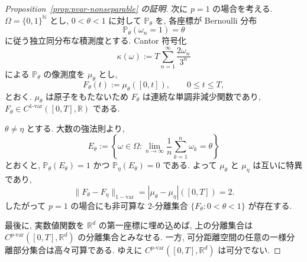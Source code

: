\documentclass[11pt]{article}
\theoremstyle{breakstyle}
\begin{document}
\begin{proof}[Proposition~\ref{prop:pvar-nonseparable} の証明]
    次に $p=1$ の場合を考える. $\Omega=\{0,1\}^{\mathbb{N}}$ とし,
    $0<\theta<1$ に対して $\mathbb{P}_\theta$ を, 各座標が Bernoulli 分布
    \begin{equation*}
        \mathbb{P}_\theta(\omega_n=1)=\theta
    \end{equation*}
    に従う独立同分布な積測度とする. Cantor 符号化
    \begin{equation*}
        \kappa(\omega):=T\sum_{n=1}^\infty\frac{2\omega_n}{3^n}
    \end{equation*}
    による $\mathbb{P}_\theta$ の像測度を $\mu_\theta$ とし,
    \begin{equation*}
        F_\theta(t):=\mu_\theta([0,t]),
        \qquad 0\leq t\leq T,
    \end{equation*}
    とおく. $\mu_\theta$ は原子をもたないため $F_\theta$ は連続な単調非減少関数であり,
    $F_\theta\in C^{1\text{-var}}([0,T],\mathbb{R})$ である.

    $\theta\neq\eta$ とする. 大数の強法則より,
    \begin{equation*}
        E_\theta:=\left\{\omega\in\Omega:
        \lim_{n\to\infty}\frac1n\sum_{k=1}^n\omega_k=\theta\right\}
    \end{equation*}
    とおくと, $\mathbb{P}_\theta(E_\theta)=1$ かつ
    $\mathbb{P}_\eta(E_\theta)=0$ である. よって $\mu_\theta$ と $\mu_\eta$ は互いに特異であり,
    \begin{equation*}
        \|F_\theta-F_\eta\|_{\mathrm{1-var}}
        =|\mu_\theta-\mu_\eta|([0,T])=2.
    \end{equation*}
    したがって $p=1$ の場合にも非可算な $2$-分離集合
    $\{F_\theta:0<\theta<1\}$ が存在する.

    最後に, 実数値関数を $\mathbb{R}^d$ の第一座標に埋め込めば,
    上の分離集合は $C^{p\text{-var}}([0,T],\mathbb{R}^d)$ の分離集合とみなせる.
    一方, 可分距離空間の任意の一様分離部分集合は高々可算である.
    ゆえに $C^{p\text{-var}}([0,T],\mathbb{R}^d)$ は可分でない.
\end{proof}
\end{document}

